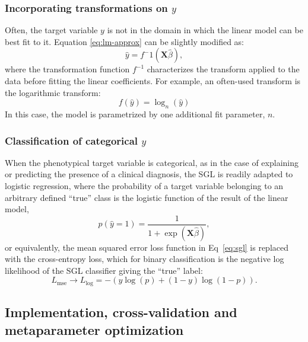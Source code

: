 \subsubsection*{Incorporating transformations on $y$}

Often, the target variable $y$ is not in the domain in which the linear
model can be best fit to it. Equation \eqref{eq:lm-approx} can be slightly
modified as:
\begin{equation}
    \hat{y} = f^-1(\mathbf{X} \hat{\beta}),
    \label{eq:lm-transform}
\end{equation}
where the transformation function $f^{-1}$ characterizes the transform
applied to the data before fitting the linear coefficients. For example,
an often-used transform is the logarithmic transform:
\begin{equation}
    f(\hat{y}) = \log_n(\hat{y})
    \label{eq:log-nonlinearity}
\end{equation}
In this case, the model is parametrized by one additional fit parameter,
$n$.

\subsubsection*{Classification of categorical $y$}
When the phenotypical target variable is categorical, as in the case of
explaining or predicting the presence of a clinical diagnosis, the SGL is
readily adapted to logistic regression, where the probability of a target
variable belonging to an arbitrary defined ``true'' class is the logistic
function of the result of the linear model,
\begin{equation}
    p(\hat{y} = 1) = \frac{1}{1 + \exp(\mathbf{X} \hat{\beta})},
    \label{eq:logit}
\end{equation}
or equivalently, the mean squared error loss function in Eq~\eqref{eq:sgl} is
replaced with the cross-entropy loss, which for binary classification is the
negative log likelihood of the SGL classifier giving the ``true'' label:
\begin{equation}
    L_{\text{mse}} \rightarrow L_{\log} =
    -\left(y \log(p) + (1 - y) \log(1 - p)\right).
    \label{eq:logloss}
\end{equation}

\subsection*{Implementation, cross-validation and metaparameter optimization}

